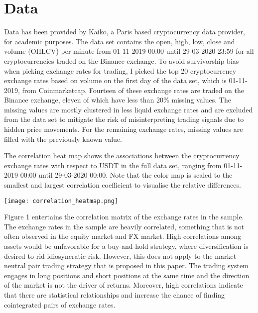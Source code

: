 \documentclass[12pt,english,authoryear]{article}
\begin{document}
\section{Data} \label{sec:Data}

Data has been provided by Kaiko, a Paris based cryptocurrency data provider, for academic purposes. The data set contains the open, high, low, close and volume (OHLCV) per minute from 01-11-2019 00:00 until 29-03-2020 23:59 for all cryptocurrencies traded on the Binance exchange. To avoid survivorship bias when picking exchange rates for trading, I picked the top 20 cryptocurrency exchange rates based on volume on the first day of the data set, which is 01-11-2019, from Coinmarketcap. Fourteen of these exchange rates are traded on the Binance exchange, eleven of which have less than 20\% missing values. The missing values are mostly clustered in less liquid exchange rates and are excluded from the data set to mitigate the risk of misinterpreting trading signals due to hidden price movements. For the remaining exchange rates, missing values are filled with the previously known value.

\begin{center}
\begin{minipage}{\textwidth}
\caption*{\footnotesize The correlation heat map shows the associations between the cryptocurrency exchange rates with respect to USDT in the full data set, ranging from 01-11-2019 00:00 until 29-03-2020 00:00. Note that the color map is scaled to the smallest and largest correlation coefficient to visualise the relative differences.}
\texttt{[image: correlation\_heatmap.png]}
\end{minipage}
\end{center}

Figure 1 entertains the correlation matrix of the exchange rates in the sample. The exchange rates in the sample are heavily correlated, something that is not often observed in the equity market and FX market. High correlations among assets would be unfavorable for a buy-and-hold strategy, where diversification is desired to rid idiosyncratic risk. However, this does not apply to the market neutral pair trading strategy that is proposed in this paper. The trading system engages in long positions and short positions at the same time and the direction of the market is not the driver of returns. Moreover, high correlations indicate that there are statistical relationships and increase the chance of finding cointegrated pairs of exchange rates. 
\end{document}
